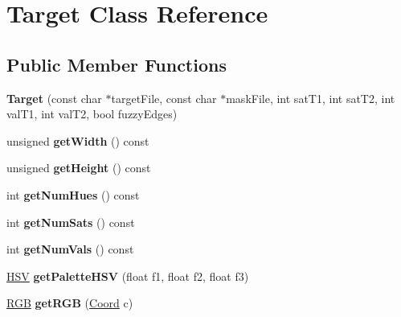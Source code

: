 \hypertarget{class_target}{\section{Target Class Reference}
\label{class_target}
}
\subsection*{Public Member Functions}
\begin{DoxyCompactItemize}
\item 
\hypertarget{class_target_a229aad2bdd8cd6292f3934298a5f8bff}{{\bfseries Target} (const char $\ast$target\-File, const char $\ast$mask\-File, int sat\-T1, int sat\-T2, int val\-T1, int val\-T2, bool fuzzy\-Edges)}\label{class_target_a229aad2bdd8cd6292f3934298a5f8bff}

\item 
\hypertarget{class_target_a19b303c9cfe0c80c01b9520914575f58}{unsigned {\bfseries get\-Width} () const }\label{class_target_a19b303c9cfe0c80c01b9520914575f58}

\item 
\hypertarget{class_target_af5d9fd48a92d0c7cb930a76f039236c8}{unsigned {\bfseries get\-Height} () const }\label{class_target_af5d9fd48a92d0c7cb930a76f039236c8}

\item 
\hypertarget{class_target_a14b0b365760f5ae692e24c4e053aa719}{int {\bfseries get\-Num\-Hues} () const }\label{class_target_a14b0b365760f5ae692e24c4e053aa719}

\item 
\hypertarget{class_target_aaf727abb18a9b8c2f3f4fbe7fd638881}{int {\bfseries get\-Num\-Sats} () const }\label{class_target_aaf727abb18a9b8c2f3f4fbe7fd638881}

\item 
\hypertarget{class_target_a228266c37c11e3a5d026eadc2bb0879f}{int {\bfseries get\-Num\-Vals} () const }\label{class_target_a228266c37c11e3a5d026eadc2bb0879f}

\item 
\hypertarget{class_target_a176f3568bbccec8d9be3a86c4155fc39}{\hyperlink{struct_h_s_v}{H\-S\-V} {\bfseries get\-Palette\-H\-S\-V} (float f1, float f2, float f3)}\label{class_target_a176f3568bbccec8d9be3a86c4155fc39}

\item 
\hypertarget{class_target_af9bce9d96980ce3f11966ac00cf71654}{\hyperlink{struct_r_g_b}{R\-G\-B} {\bfseries get\-R\-G\-B} (\hyperlink{struct_coord}{Coord} c)}\label{class_target_af9bce9d96980ce3f11966ac00cf71654}


\end{DoxyCompactItemize}
